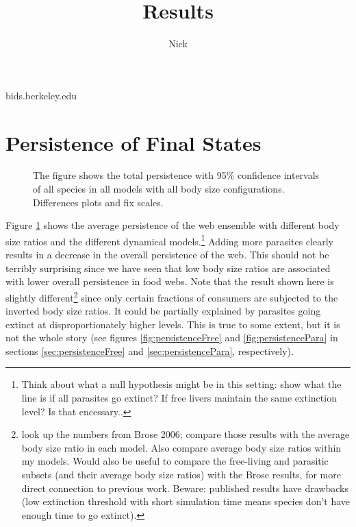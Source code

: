\documentclass[11pt]{amsart}
\title{Results}
\author{Nick}
\begin{document}
bids.berkeley.edu
\section{Persistence of Final States}

\captionsetup[subfigure]{labelfont = it, textfont = it,labelformat = parens,labelsep = space}

\begin{figure}[h] 
\caption{The figure shows the total persistence with 95\% confidence intervals of all species in all models with all body size configurations.  Differences plots and fix scales.}
\label{fig:persistenceAll}
\end{figure}

Figure \ref{fig:persistenceAll} shows the average persistence of the web ensemble with different body size ratios and the different dynamical models.\footnote{Think about what a null hypothesis might be in this setting: show what the line is if all parasites go extinct?  If free livers maintain the same extinction level?  Is that encessary..}  Adding more parasites clearly results in a decrease in the overall persistence of the web.  This should not be terribly surprising since we have seen that low body size ratios are associated with lower overall persistence in food webs.  Note that the result shown here is slightly different\footnote{look up the numbers from Brose 2006; compare those results with the average body size ratio in each model.  Also compare average body size ratios within my models.  Would also be useful to compare the free-living and parasitic subsets (and their average body size ratios) with the Brose results, for more direct connection to previous work.  Beware: published results have drawbacks (low extinction threshold with short simulation time means species don't have enough time to go extinct).} since only certain fractions of consumers are subjected to the inverted body size ratios. It could be partially explained by parasites going extinct at disproportionately higher levels.  This is true to some extent, but it is not the whole story (see figures \ref{fig:persistenceFree} and \ref{fig:persistencePara} in sections \ref{sec:persistenceFree} and \ref{sec:persistencePara}, respectively).
\end{document}
